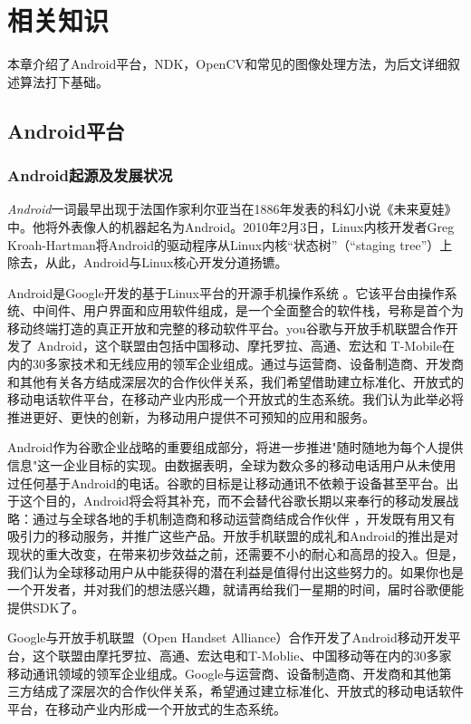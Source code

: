 \documentclass{XDBAthesis}
\begin{document}
\else
\fi
\chapter{相关知识}
本章介绍了Android平台，NDK，OpenCV和常见的图像处理方法，为后文详细叙述算法打下基础。
\section{Android平台}

\subsection{Android起源及发展状况}

\emph{Android}一词最早出现于法国作家利尔亚当在1886年发表的科幻小说《未来夏娃》中。他将外表像人的机器起名为Android。2010年2月3日，Linux内核开发者Greg Kroah-Hartman将Android的驱动程序从Linux内核“状态树”（“staging tree”）上除去，从此，Android与Linux核心开发分道扬镳。

Android是Google开发的基于Linux平台的开源手机操作系统\cite{单李旺2009android} 。它该平台由操作系统、中间件、用户界面和应用软件组成，是一个全面整合的软件栈，号称是首个为移动终端打造的真正开放和完整的移动软件平台。you谷歌与开放手机联盟合作开发了 Android，这个联盟由包括中国移动、摩托罗拉、高通、宏达和 T-Mobile在内的30多家技术和无线应用的领军企业组成。通过与运营商、设备制造商、开发商和其他有关各方结成深层次的合作伙伴关系，我们希望借助建立标准化、开放式的移动电话软件平台，在移动产业内形成一个开放式的生态系统。我们认为此举必将推进更好、更快的创新，为移动用户提供不可预知的应用和服务。

Android作为谷歌企业战略的重要组成部分，将进一步推进"随时随地为每个人提供信息"这一企业目标的实现。由数据表明，全球为数众多的移动电话用户从未使用过任何基于Android的电话。谷歌的目标是让移动通讯不依赖于设备甚至平台。出于这个目的，Android将会将其补充，而不会替代谷歌长期以来奉行的移动发展战略：通过与全球各地的手机制造商和移动运营商结成合作伙伴\cite{罗翔2010symbian} ，开发既有用又有吸引力的移动服务，并推广这些产品。开放手机联盟的成礼和Android的推出是对现状的重大改变，在带来初步效益之前，还需要不小的耐心和高昂的投入。但是，我们认为全球移动用户从中能获得的潜在利益是值得付出这些努力的。如果你也是一个开发者，并对我们的想法感兴趣，就请再给我们一星期的时间，届时谷歌便能提供SDK了。

Google与开放手机联盟（Open Handset Alliance）合作开发了Android移动开发平台，这个联盟由摩托罗拉、高通、宏达电和T-Moblie、中国移动等在内的30多家移动通讯领域的领军企业组成。Google与运营商、设备制造商、开发商和其他第三方结成了深层次的合作伙伴关系，希望通过建立标准化、开放式的移动电话软件平台，在移动产业内形成一个开放式的生态系统。    
\end{document}
